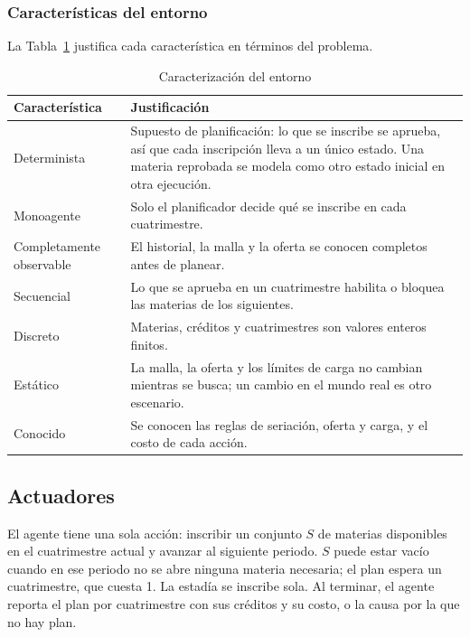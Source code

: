 \subsubsection{Características del entorno}
La Tabla~\ref{TAB::Entorno} justifica cada característica en términos del problema.
\begin{table}[H]
  \begin{center}
    \caption{Caracterización del entorno}
    \label{TAB::Entorno}
     \begin{tabular}{|| l | p{9.5cm} ||}
        \hline
        Característica & Justificación\\ [0.5ex]
        \hline\hline
        Determinista & Supuesto de planificación: lo que se inscribe se aprueba, así que cada inscripción lleva a un único estado. Una materia reprobada se modela como otro estado inicial en otra ejecución. \\
        \hline
        Monoagente & Solo el planificador decide qué se inscribe en cada cuatrimestre. \\
        \hline
        Completamente observable & El historial, la malla y la oferta se conocen completos antes de planear. \\
        \hline
        Secuencial & Lo que se aprueba en un cuatrimestre habilita o bloquea las materias de los siguientes. \\
        \hline
        Discreto & Materias, créditos y cuatrimestres son valores enteros finitos. \\
        \hline
        Estático & La malla, la oferta y los límites de carga no cambian mientras se busca; un cambio en el mundo real es otro escenario. \\
        \hline
        Conocido & Se conocen las reglas de seriación, oferta y carga, y el costo de cada acción. \\
        \hline
    \end{tabular}
  \end{center}
\end{table}

\subsection{Actuadores}
El agente tiene una sola acción: inscribir un conjunto $S$ de materias disponibles en el cuatrimestre actual y avanzar al siguiente periodo. $S$ puede estar vacío cuando en ese periodo no se abre ninguna materia necesaria; el plan espera un cuatrimestre, que cuesta 1. La estadía se inscribe sola. Al terminar, el agente reporta el plan por cuatrimestre con sus créditos y su costo, o la causa por la que no hay plan.

